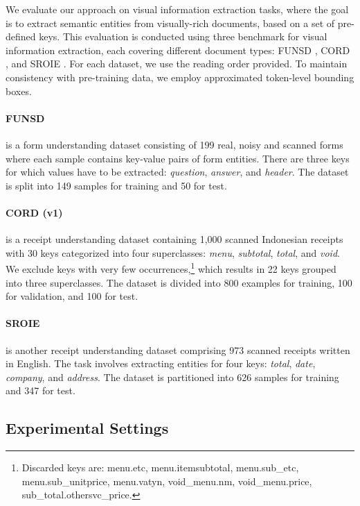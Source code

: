 We evaluate our approach on visual information extraction tasks, where the goal is to extract semantic entities from visually-rich documents, based on a set of pre-defined keys. This evaluation is conducted using three benchmark for visual information extraction, each covering different document types: FUNSD \citep{jaume2019funsd}, CORD \citep{park2019cord}, and SROIE \citep{huang2019icdar2019}. For each dataset, we use the reading order provided. To maintain consistency with pre-training data, we employ approximated token-level bounding boxes.

\paragraph{FUNSD} \citep{jaume2019funsd} is a form understanding dataset consisting of 199 real, noisy and scanned forms where each sample contains key-value pairs of form entities. There are three keys for which values have to be extracted: \textit{question}, \textit{answer}, and \textit{header}. The dataset is split into 149 samples for training and 50 for test.

\paragraph{CORD (v1)} \citep{park2019cord} is a receipt understanding dataset containing 1,000 scanned Indonesian receipts with 30 keys categorized into four superclasses: \textit{menu}, \textit{subtotal}, \textit{total}, and \textit{void}. We exclude keys with very few occurrences,\footnote{Discarded keys are: menu.etc, menu.itemsubtotal, menu.sub\_etc, menu.sub\_unitprice, menu.vatyn, void\_menu.nm, void\_menu.price, sub\_total.othersvc\_price.} which results in 22 keys grouped into three superclasses. The dataset is divided into 800 examples for training, 100 for validation, and 100 for test.

\paragraph{SROIE} \citep{huang2019icdar2019} is another receipt understanding dataset comprising 973 scanned receipts written in English. The task involves extracting entities for four keys: \textit{total}, \textit{date}, \textit{company}, and \textit{address}. The dataset is partitioned into 626 samples for training and 347 for test. 

\subsection{Experimental Settings}

